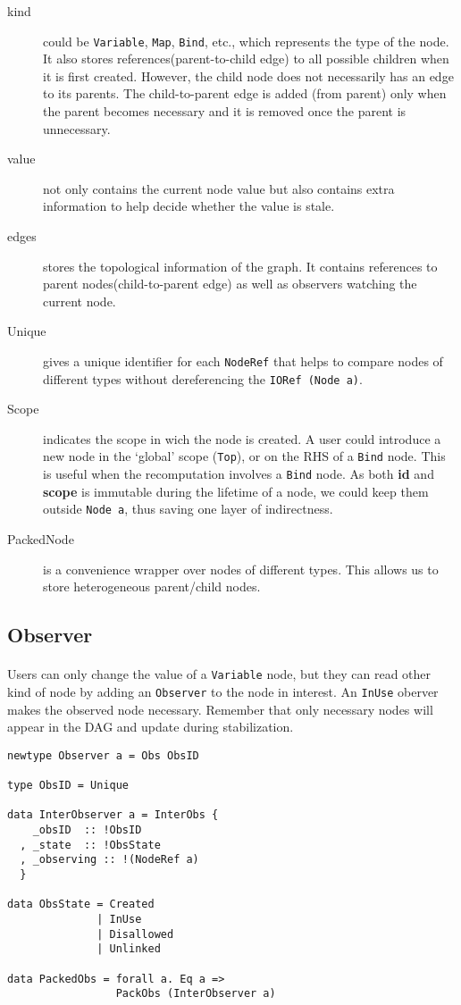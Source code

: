 \documentclass[a4paper, twocolumn]{article}
\newcommand{\code}{\texttt} %
\begin{document}
\begin{description}
  \item[kind] could be \code{Variable}, \code{Map}, \code{Bind}, etc., which represents the type of the node. It also stores references(parent-to-child edge) to all possible children when it is first created. However, the child node does not necessarily has an edge to its parents. The child-to-parent edge is added (from parent) only when the parent becomes necessary and it is removed once the parent is unnecessary.
  \item[value] not only contains the current node value but also contains extra information to help decide whether the value is stale.
  \item[edges] stores the topological information of the graph. It contains references to parent nodes(child-to-parent edge) as well as observers watching the current node.
  \item[Unique] gives a unique identifier for each \code{NodeRef} that helps to compare nodes of different types without dereferencing the \code{IORef (Node a)}.
  \item[Scope] indicates the scope in wich the node is created. A user could introduce a new node in the `global' scope (\code{Top}), or on the RHS of a \code{Bind} node. This is useful when the recomputation involves a \code{Bind} node. As both \textbf{id} and \textbf{scope} is immutable during the lifetime of a node, we could keep them outside \code{Node a}, thus saving one layer of indirectness.
  \item[PackedNode] is a convenience wrapper over nodes of different types. This allows us to store heterogeneous parent/child nodes.
\end{description}

\subsection{Observer}
\paragraph{} Users can only change the value of a \code{Variable} node, but they can read other kind of node by adding an \code{Observer} to the node in interest. An \code{InUse} oberver makes the observed node necessary. Remember that only necessary nodes will appear in the DAG and update during stabilization. 

\begin{lstlisting}[caption=Observer]
newtype Observer a = Obs ObsID

type ObsID = Unique

data InterObserver a = InterObs {
    _obsID  :: !ObsID
  , _state  :: !ObsState
  , _observing :: !(NodeRef a)
  }

data ObsState = Created 
              | InUse 
              | Disallowed 
              | Unlinked

data PackedObs = forall a. Eq a => 
                 PackObs (InterObserver a)

\end{lstlisting}
\end{document}
